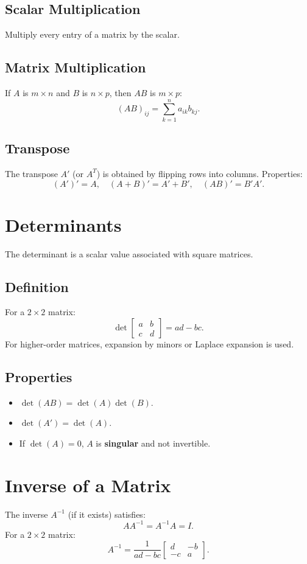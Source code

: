 \documentclass[11pt]{article}
\begin{document}
\subsection{Scalar Multiplication}
Multiply every entry of a matrix by the scalar.

\subsection{Matrix Multiplication}
If $A$ is $m \times n$ and $B$ is $n \times p$, then $AB$ is $m \times p$:
\[
(AB)_{ij} = \sum_{k=1}^n a_{ik} b_{kj}.
\]

\subsection{Transpose}
The transpose $A'$ (or $A^T$) is obtained by flipping rows into columns.  
Properties:
\[
(A')' = A, \quad (A+B)' = A' + B', \quad (AB)' = B'A'.
\]



\section{Determinants}
The determinant is a scalar value associated with square matrices.  
\subsection{Definition}
For a $2 \times 2$ matrix:
\[
\det\begin{bmatrix} a & b \\ c & d \end{bmatrix} = ad - bc.
\]
For higher-order matrices, expansion by minors or Laplace expansion is used.

\subsection{Properties}
\begin{itemize}
    \item $\det(AB) = \det(A)\det(B)$.
    \item $\det(A') = \det(A)$.
    \item If $\det(A) = 0$, $A$ is \textbf{singular} and not invertible.
\end{itemize}



\section{Inverse of a Matrix}
The inverse $A^{-1}$ (if it exists) satisfies:
\[
AA^{-1} = A^{-1}A = I.
\]
For a $2 \times 2$ matrix:
\[
A^{-1} = \frac{1}{ad - bc}\begin{bmatrix} d & -b \\ -c & a \end{bmatrix}.
\]
\end{document}
